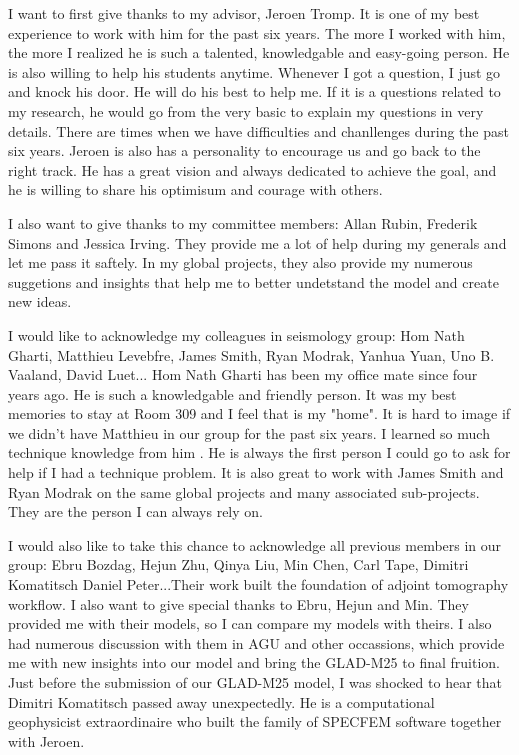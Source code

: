 I want to first give thanks to my advisor, Jeroen Tromp.
It is one of my best experience to work with him for the past six years.
The more I worked with him, the more I realized he is such a talented,
knowledgable and easy-going person. He is also willing to help his students anytime.
Whenever I got a question, I just go and knock his door. He will do his best to help me.
If it is a questions related to my research, he would go from the very basic to
explain my questions in very details.
There are times when we have difficulties and chanllenges during the past six years.
Jeroen is also has a personality to encourage us and go back to the right track.
He has a great vision and always dedicated to achieve the goal, and he is willing to
share his optimisum and courage with others.

I also want to give thanks to my committee members: Allan Rubin, Frederik Simons
and Jessica Irving. They provide me a lot of help during my generals and let me
pass it saftely. In my global projects, they also provide my numerous suggetions
and insights that help me to better undetstand the model and create new ideas.

I would like to acknowledge my colleagues in seismology group: Hom Nath Gharti,
Matthieu Levebfre, James Smith, Ryan Modrak, Yanhua Yuan, Uno B. Vaaland, David Luet...
Hom Nath Gharti has been my office mate since four years ago.
He is such a knowledgable and friendly person. It was my best memories to stay
at Room 309 and I feel that is my "home".
It is hard to image if we didn't have Matthieu in
our group for the past six years. I learned so much technique knowledge from him
. He is always the first person I could go to ask for help if I had a technique
problem.
It is also great to work with James Smith and Ryan Modrak on the same global
projects and many associated sub-projects. They are the person I can always
rely on.

I would also like to take this chance to acknowledge all previous members in our
group: Ebru Bozdag, Hejun Zhu, Qinya Liu, Min Chen, Carl Tape, Dimitri Komatitsch
Daniel Peter...Their work built the foundation of adjoint tomography workflow.
I also want to give special thanks to Ebru, Hejun and Min. They provided me with
their models, so I can compare my models with theirs. I also had numerous discussion
with them in AGU and other occassions, which provide me with new insights into
our model and bring the GLAD-M25 to final fruition. Just before the submission of our
GLAD-M25 model, I was shocked to hear that Dimitri Komatitsch passed away unexpectedly.
He is a computational geophysicist extraordinaire who built the family of SPECFEM
software together with Jeroen.

